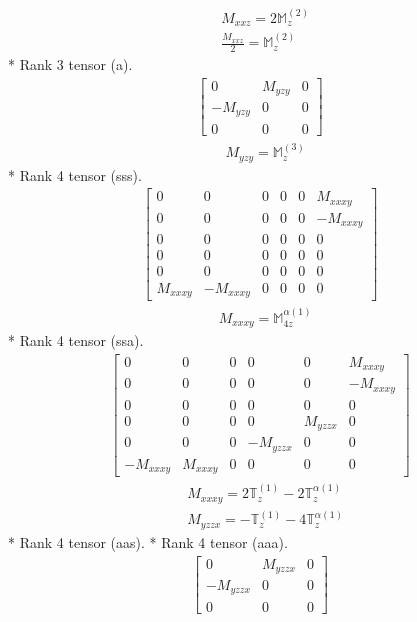 \documentclass[fleqn,8pt,landscape]{jsarticle}
\begin{document}
\begin{align*}
& M_{xxz} = 2 \mathbb{M}_{z}^{(2)} \\
& \frac{M_{xxz}}{2} = \mathbb{M}_{z}^{(2)}
\end{align*}
* Rank 3 tensor (a).
\begin{align*}
\begin{bmatrix} 0 & M_{yzy} & 0 \\ - M_{yzy} & 0 & 0 \\ 0 & 0 & 0 \end{bmatrix}
\end{align*}
\begin{align*}
& M_{yzy} = \mathbb{M}_{z}^{(3)}
\end{align*}
* Rank 4 tensor (sss).
\begin{align*}
\begin{bmatrix} 0 & 0 & 0 & 0 & 0 & M_{xxxy} \\ 0 & 0 & 0 & 0 & 0 & - M_{xxxy} \\ 0 & 0 & 0 & 0 & 0 & 0 \\ 0 & 0 & 0 & 0 & 0 & 0 \\ 0 & 0 & 0 & 0 & 0 & 0 \\ M_{xxxy} & - M_{xxxy} & 0 & 0 & 0 & 0 \end{bmatrix}
\end{align*}
\begin{align*}
& M_{xxxy} = \mathbb{M}_{4z}^{\alpha(1)}
\end{align*}
* Rank 4 tensor (ssa).
\begin{align*}
\begin{bmatrix} 0 & 0 & 0 & 0 & 0 & M_{xxxy} \\ 0 & 0 & 0 & 0 & 0 & - M_{xxxy} \\ 0 & 0 & 0 & 0 & 0 & 0 \\ 0 & 0 & 0 & 0 & M_{yzzx} & 0 \\ 0 & 0 & 0 & - M_{yzzx} & 0 & 0 \\ - M_{xxxy} & M_{xxxy} & 0 & 0 & 0 & 0 \end{bmatrix}
\end{align*}
\begin{align*}
& M_{xxxy} = 2 \mathbb{T}_{z}^{(1)} - 2 \mathbb{T}_{z}^{\alpha(1)} \\
& M_{yzzx} = - \mathbb{T}_{z}^{(1)} - 4 \mathbb{T}_{z}^{\alpha(1)}
\end{align*}
* Rank 4 tensor (aas).
* Rank 4 tensor (aaa).
\begin{align*}
\begin{bmatrix} 0 & M_{yzzx} & 0 \\ - M_{yzzx} & 0 & 0 \\ 0 & 0 & 0 \end{bmatrix}
\end{align*}
\end{document}
